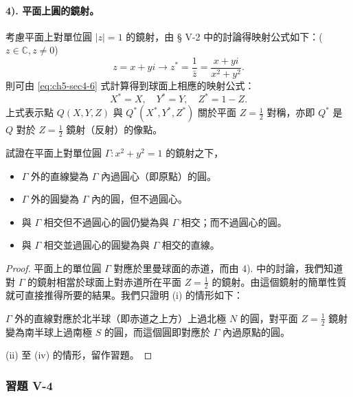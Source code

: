 \paragraph{4). 平面上圓的鏡射。}
考慮平面上對單位圓 $|z|=1$ 的鏡射，由 § V-2 中的討論得映射公式如下：($z \in \mathbb{C}, z \neq 0$)
\[
z = x+yi \longrightarrow z^* = \frac{1}{\bar{z}} = \frac{x+yi}{x^2+y^2}.
\]
則可由 \eqref{eq:ch5-sec4-6} 式計算得到球面上相應的映射公式：
\[
X^* = X, \quad Y^* = Y, \quad Z^* = 1-Z.
\]
上式表示點 $Q(X, Y, Z)$ 與 $Q^*(X^*, Y^*, Z^*)$ 關於平面 $Z=\frac{1}{2}$ 對稱，亦即 $Q^*$ 是 $Q$ 對於 $Z=\frac{1}{2}$ 鏡射（反射）的像點。

\begin{example}
試證在平面上對單位圓 $\Gamma: x^2+y^2=1$ 的鏡射之下，
\begin{itemize}
  \item[(i)] $\Gamma$ 外的直線變為 $\Gamma$ 內過圓心（即原點）的圓。
  \item[(ii)] $\Gamma$ 外的圓變為 $\Gamma$ 內的圓，但不過圓心。
  \item[(iii)] 與 $\Gamma$ 相交但不過圓心的圓仍變為與 $\Gamma$ 相交；而不過圓心的圓。
  \item[(iv)] 與 $\Gamma$ 相交並過圓心的圓變為與 $\Gamma$ 相交的直線。
\end{itemize}
\end{example}

\begin{proof}
平面上的單位圓 $\Gamma$ 對應於里曼球面的赤道，而由 4). 中的討論，我們知道對 $\Gamma$ 的鏡射相當於球面上對赤道所在平面 $Z=\frac{1}{2}$ 的鏡射。由這個鏡射的簡單性質就可直接推得所要的結果。我們只證明 (i) 的情形如下：

$\Gamma$ 外的直線對應於北半球（即赤道之上方）上過北極 $N$ 的圓，對平面 $Z=\frac{1}{2}$ 鏡射變為南半球上過南極 $S$ 的圓，而這個圓即對應於 $\Gamma$ 內過原點的圓。

(ii) 至 (iv) 的情形，留作習題。 \qedhere
\end{proof}

\subsubsection*{習題 V-4}

